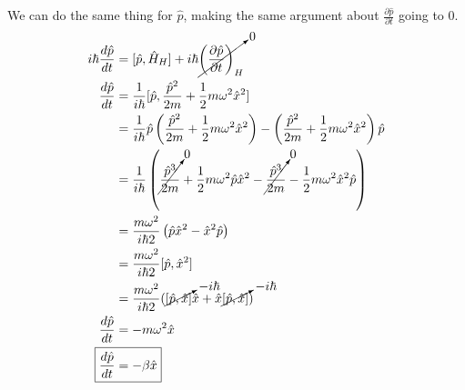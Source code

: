 \documentclass{jhwhw}
\begin{document}
We can do the same thing for $\hat{p}$, making the same argument about $\frac{\partial \hat{p}}{\partial t}$ going to $0$.
\begin{align}
	i \hbar \frac{d \hat{p}}{dt} 
	&= 
	[\hat{p}, \hat{H}_H] + i \hbar \cancelto{0}{\left( \frac{
	\partial \hat{p}}{\partial t} \right)_H}
	\\
	\frac{d \hat{p}}{dt}
	&=
	\frac{1}{i \hbar} [\hat{p}, \frac{\hat{p}^2}{2m} + \frac{1}{2} m \omega^2 \hat{x}^2]
	\\
	&=
	\frac{1}{i \hbar}
	\hat{p} \left(\frac{\hat{p}^2}{2m} + \frac{1}{2} m \omega^2 \hat{x}^2\right)
	- 
	\left(\frac{\hat{p}^2}{2m} + \frac{1}{2} m \omega^2 \hat{x}^2 \right)\hat{p}
	\\
	&=
	\frac{1}{i \hbar} \left(
	 \cancelto{0}{\frac{\hat{p}^3}{2m}}+ \frac{1}{2} m \omega^2 \hat{p} \hat{x}^2
	- 
	\cancelto{0}{\frac{\hat{p}^3}{2m}} - \frac{1}{2} m \omega^2 \hat{x}^2 \hat{p}
	\right)
	\\
	&=
	\frac{m \omega^2}{i \hbar 2} \left(
	\hat{p} \hat{x}^2
	- 
	\hat{x}^2 \hat{p}
	\right)
	\\
	&=
	\frac{m \omega^2}{i \hbar 2} 
	[\hat{p},\hat{x}^2]
	\\
	&=
	\frac{m \omega^2}{i \hbar 2} 
	(\cancelto{-i \hbar}{[\hat{p},\hat{x}]}\hat{x} + \hat{x}\cancelto{-i \hbar}{[\hat{p},\hat{x}]})
	\\
	\frac{d \hat{p}}{dt}
	&=
	- m \omega^2 \hat{x}
	\\
	\Aboxed{\frac{d \hat{p}}{dt}
	&=
	- \beta \hat{x} & \text{where }\beta &= m \omega^2 }
\end{align}

\pagebreak[4]
\end{document}
